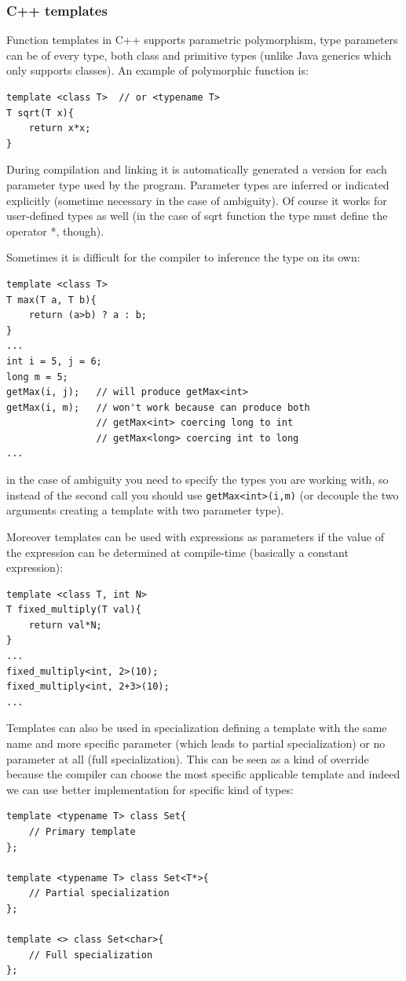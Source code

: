 \subsubsection{C++ templates}
Function templates in C++ supports parametric polymorphism, type parameters can be of every type, both class and primitive types (unlike Java generics which only supports classes).
An example of polymorphic function is:
\begin{verbatim}
template <class T>  // or <typename T>
T sqrt(T x){
    return x*x;
}
\end{verbatim}
During compilation and linking it is automatically generated a version for each parameter type used by the program.
Parameter types are inferred or indicated explicitly (sometime necessary in the case of ambiguity).
Of course it works for user-defined types as well (in the case of sqrt function the type must define the operator *, though).

Sometimes it is difficult for the compiler to inference the type on its own:
\begin{verbatim}
template <class T>
T max(T a, T b){
    return (a>b) ? a : b;
}
...
int i = 5, j = 6;
long m = 5;
getMax(i, j);   // will produce getMax<int>
getMax(i, m);   // won't work because can produce both
                // getMax<int> coercing long to int
                // getMax<long> coercing int to long
...
\end{verbatim}
in the case of ambiguity you need to specify the types you are working with, so instead of the second call you should use \verb|getMax<int>(i,m)| (or decouple the two arguments creating a template with two parameter type).

Moreover templates can be used with expressions as parameters if the value of the expression can be determined at compile-time (basically a constant expression):
\begin{verbatim}
template <class T, int N>
T fixed_multiply(T val){
    return val*N;
}
...
fixed_multiply<int, 2>(10);
fixed_multiply<int, 2+3>(10);
...
\end{verbatim}

Templates can also be used in specialization defining a template with the same name and more specific parameter (which leads to partial specialization) or no parameter at all (full specialization).
This can be seen as a kind of override because the compiler can choose the most specific applicable template and indeed we can use better implementation for specific kind of types:
\begin{verbatim}
template <typename T> class Set{
    // Primary template
};

template <typename T> class Set<T*>{
    // Partial specialization
};

template <> class Set<char>{
    // Full specialization
};
\end{verbatim}

